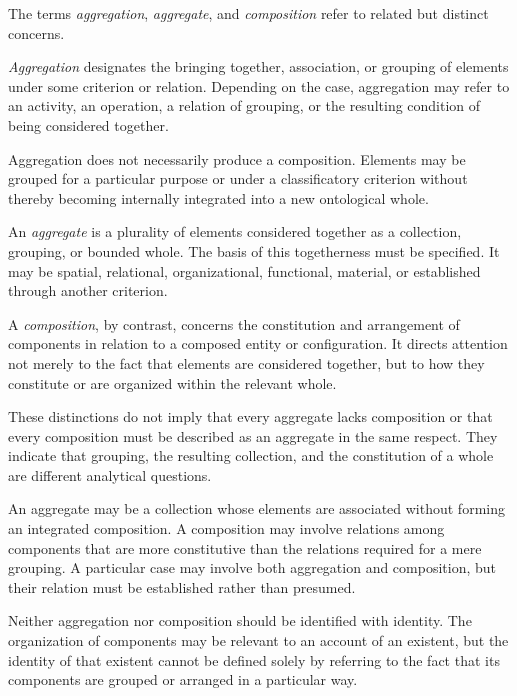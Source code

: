 The terms \emph{aggregation}, \emph{aggregate},
and \emph{composition} refer to related but
distinct concerns.

\emph{Aggregation} designates the bringing
together, association, or grouping of elements
under some criterion or relation. Depending
on the case, aggregation may refer to an
activity, an operation, a relation of grouping,
or the resulting condition of being considered
together.

Aggregation does not necessarily produce
a composition. Elements may be grouped for
a particular purpose or under a classificatory
criterion without thereby becoming internally
integrated into a new ontological whole.

An \emph{aggregate} is a plurality of elements
considered together as a collection, grouping,
or bounded whole. The basis of this togetherness
must be specified. It may be spatial, relational,
organizational, functional, material, or
established through another criterion.

A \emph{composition}, by contrast, concerns
the constitution and arrangement of components
in relation to a composed entity or configuration.
It directs attention not merely to the fact
that elements are considered together, but
to how they constitute or are organized within
the relevant whole.

These distinctions do not imply that every
aggregate lacks composition or that every
composition must be described as an aggregate
in the same respect. They indicate that
grouping, the resulting collection, and the
constitution of a whole are different
analytical questions.

An aggregate may be a collection whose elements
are associated without forming an integrated
composition. A composition may involve relations
among components that are more constitutive
than the relations required for a mere grouping.
A particular case may involve both aggregation
and composition, but their relation must be
established rather than presumed.

Neither aggregation nor composition should
be identified with identity. The organization
of components may be relevant to an account
of an existent, but the identity of that
existent cannot be defined solely by referring
to the fact that its components are grouped
or arranged in a particular way.


